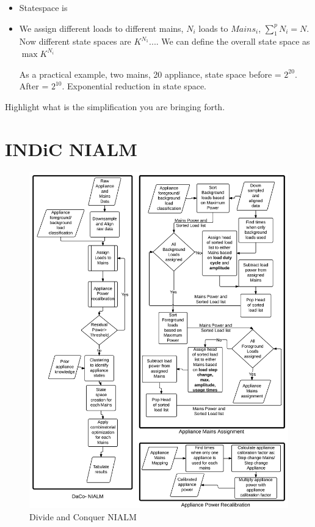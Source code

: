 \documentclass[conference]{IEEEtran}
\begin{document}
\begin{itemize}
\item Statespace is 
\item We assign different loads to different mains, $N_i$ loads to $Mains_i$, $\sum\limits_{1}^{p}{N_i}=N$. Now different state spaces are
$K^{N_1}$.... We can define the overall state space as $\max{K^{N_i}}$

As a practical example, two mains, 20 appliance, state space before = $2^{20}$. After = $2^{10}$. Exponential reduction in state space.
\end{itemize}

Highlight what is the simplification you are bringing forth.

\section{INDiC NIALM}
\begin{figure}
\centering \includegraphics[scale=0.1]{./figures/algo_3.png}
\caption{Divide and Conquer NIALM}
   \label{fig:algorithm}
\end{figure}
\end{document}
